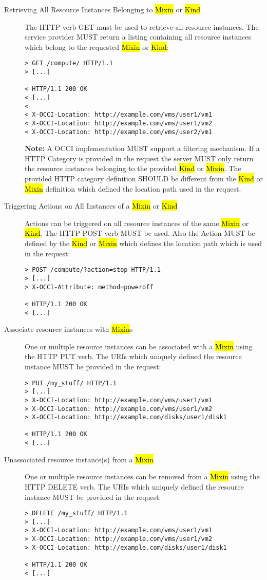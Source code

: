 \documentclass[10pt,a4paper]{article}
\begin{document}
\begin{description}
\item[Retrieving All Resource Instances Belonging to \hl{Mixin} or
  \hl{Kind}] The HTTP verb GET must be used to retrieve all resource
  instances. The service provider MUST return a listing containing
  all resource instances which belong to the requested \hl{Mixin} or
  \hl{Kind}:
\begin{verbatim}
> GET /compute/ HTTP/1.1
> [...]
 
< HTTP/1.1 200 OK
< [...]
< 
< X-OCCI-Location: http://example.com/vms/user1/vm1
< X-OCCI-Location: http://example.com/vms/user1/vm2
< X-OCCI-Location: http://example.com/vms/user2/vm1
\end{verbatim}
\textbf{Note:} A OCCI implementation MUST support a filtering
mechanism. If a HTTP Category is provided in the request the server
MUST only return the resource instances belonging to the provided
\hl{Kind} or \hl{Mixin}. The provided HTTP category definition SHOULD
be different from the \hl{Kind} or \hl{Mixin} definition which defined
the location path used in the request.

\item[Triggering Actions on All Instances of a \hl{Mixin} or
  \hl{Kind}] Actions can be triggered on all resource instances of the
  same \hl{Mixin} or \hl{Kind}. The HTTP POST verb MUST be used. Also
  the Action MUST be defined by the \hl{Kind} or \hl{Mixin} which
  defines the location path which is used in the request:
\begin{verbatim}
> POST /compute/?action=stop HTTP/1.1
> [...]
> X-OCCI-Attribute: method=poweroff

< HTTP/1.1 200 OK
< [...]
\end{verbatim}

\item[Associate resource instances with \hl{Mixin}s] One
  or multiple resource instances can be associated with a \hl{Mixin}
  using the HTTP PUT verb. The URIs which uniquely defined the
  resource instance MUST be provided in the request:
\begin{verbatim}
> PUT /my_stuff/ HTTP/1.1
> [...]
> X-OCCI-Location: http://example.com/vms/user1/vm1
> X-OCCI-Location: http://example.com/vms/user1/vm2
> X-OCCI-Location: http://example.com/disks/user1/disk1

< HTTP/1.1 200 OK
< [...]
\end{verbatim}

\item[Unassociated resource instance(s) from a \hl{Mixin}] One or multiple
  resource instances can be removed from a \hl{Mixin} using the HTTP
  DELETE verb. The URIs which uniquely defined the resource instance
  MUST be provided in the request:
\begin{verbatim}
> DELETE /my_stuff/ HTTP/1.1
> [...]
> X-OCCI-Location: http://example.com/vms/user1/vm1
> X-OCCI-Location: http://example.com/vms/user1/vm2
> X-OCCI-Location: http://example.com/disks/user1/disk1

< HTTP/1.1 200 OK
< [...]
\end{verbatim}
\end{description}
\end{document}
